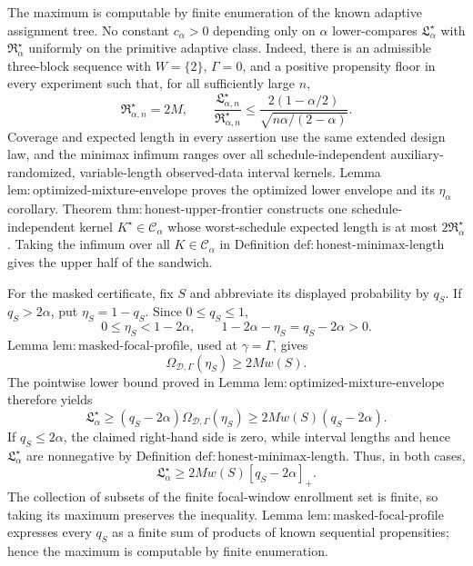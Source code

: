 The maximum is computable by finite enumeration of the known adaptive assignment tree.  No constant \(c_\alpha>0\) depending only on \(\alpha\) lower-compares \(\mathfrak L_\alpha^\star\) with \(\mathfrak R_\alpha^\star\) uniformly on the primitive adaptive class.  Indeed, there is an admissible three-block sequence with \(W=\{2\}\), \(\Gamma=0\), and a positive propensity floor in every experiment such that, for all sufficiently large \(n\),
\[
 \mathfrak R_{\alpha,n}^\star=2M,
 \qquad
 \frac{\mathfrak L_{\alpha,n}^\star}{\mathfrak R_{\alpha,n}^\star}
 \le
 \frac{2(1-\alpha/2)}{\sqrt{n\alpha/(2-\alpha)}}.
\]
Coverage and expected length in every assertion use the same extended design law, and the minimax infimum ranges over all schedule-independent auxiliary-randomized, variable-length observed-data interval kernels.
Lemma \(\mathrm{lem:optimized\text{-}mixture\text{-}envelope}\) proves the optimized lower envelope and its \(\eta_\alpha\) corollary.  Theorem \(\mathrm{thm:honest\text{-}upper\text{-}frontier}\) constructs one schedule-independent kernel \(K^\star\in\mathcal C_\alpha\) whose worst-schedule expected length is at most \(2\mathfrak R_\alpha^\star\).  Taking the infimum over all \(K\in\mathcal C_\alpha\) in Definition \(\mathrm{def:honest\text{-}minimax\text{-}length}\) gives the upper half of the sandwich.

For the masked certificate, fix \(S\) and abbreviate its displayed probability by \(q_S\).  If \(q_S>2\alpha\), put \(\eta_S=1-q_S\).  Since \(0\le q_S\le1\),
\[
 0\le\eta_S<1-2\alpha,
 \qquad
 1-2\alpha-\eta_S=q_S-2\alpha>0.
\]
Lemma \(\mathrm{lem:masked\text{-}focal\text{-}profile}\), used at \(\gamma=\Gamma\), gives
\[
 \Omega_{\mathcal D,\Gamma}(\eta_S)\ge2Mw(S).
\]
The pointwise lower bound proved in Lemma \(\mathrm{lem:optimized\text{-}mixture\text{-}envelope}\) therefore yields
\[
 \mathfrak L_\alpha^\star
 \ge(q_S-2\alpha)\Omega_{\mathcal D,\Gamma}(\eta_S)
 \ge2Mw(S)(q_S-2\alpha).
\]
If \(q_S\le2\alpha\), the claimed right-hand side is zero, while interval lengths and hence \(\mathfrak L_\alpha^\star\) are nonnegative by Definition \(\mathrm{def:honest\text{-}minimax\text{-}length}\).  Thus, in both cases,
\[
 \mathfrak L_\alpha^\star\ge2Mw(S)[q_S-2\alpha]_+.
\]
The collection of subsets of the finite focal-window enrollment set is finite, so taking its maximum preserves the inequality.  Lemma \(\mathrm{lem:masked\text{-}focal\text{-}profile}\) expresses every \(q_S\) as a finite sum of products of known sequential propensities; hence the maximum is computable by finite enumeration.

